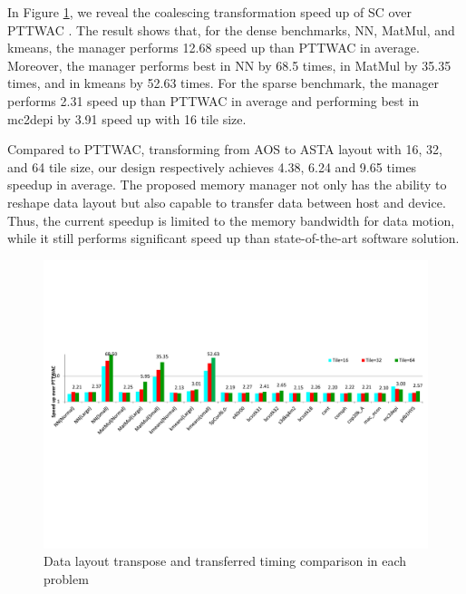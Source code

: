 \documentclass[10pt,journal,compsoc]{IEEEtran}
\begin{document}
In Figure \ref{fig:transpose_benchmark}, we reveal the coalescing transformation speed up of SC over PTTWAC \cite{ASTA}.
The result shows that, for the dense benchmarks, NN, MatMul, and kmeans, the manager performs
12.68 speed up than PTTWAC in average. Moreover, the manager performs best in NN by
 68.5 times, in MatMul by 35.35 times, and in kmeans by 52.63 times.
For the sparse benchmark, the manager performs
2.31 speed up than PTTWAC in average and performing best in mc2depi by 3.91 speed up with 16 tile size.

Compared to PTTWAC, transforming from AOS to ASTA layout with 16, 32, and 64 tile size, our design respectively achieves 4.38, 6.24 and 9.65 times speedup in average.
The proposed memory manager not only has the ability to reshape data layout but also capable to transfer data between host and device.
Thus, the current speedup is limited to the memory bandwidth for data motion, while it still performs significant speed up than state-of-the-art software solution.

\begin{figure}[tb]
\begin{center}
\graphicspath{{picture/}}
\includegraphics[width=\textwidth]{transpose_total_with_shape}
\caption{Data layout transpose and transferred timing comparison in each problem}
\label{fig:transpose_benchmark}
\end{center}
\end{figure}
\end{document}

